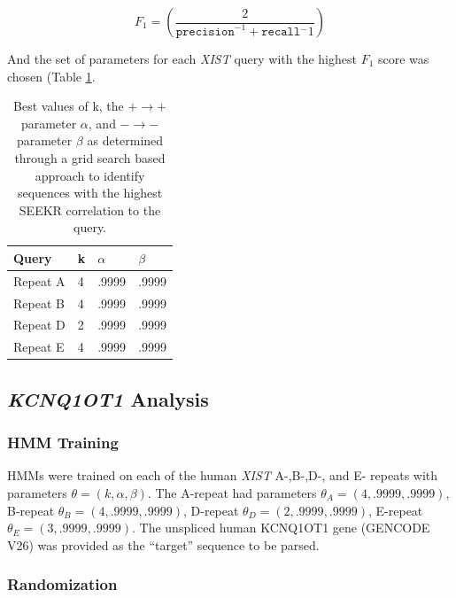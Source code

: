 \begin{equation}
    F_1 = \left(\frac{2}{\texttt{precision}^{-1}+\texttt{recall}{^-1}}\right)
\end{equation}

And the set of parameters for each \emph{XIST} query with the highest $F_1$ score was chosen (Table \ref{tbl:rsxparams}.

\begin{table}[h]
\centering
\begin{center}
 \begin{tabular}{|l| l| l | l |} 
 \hline
 Query & k & $\alpha$ & $\beta$ \\
 \hline
 Repeat A & 4 & .9999 & .9999 \\ 
 \hline
 Repeat B & 4 & .9999 & .9999\\
 \hline
 Repeat D & 2 & .9999 & .9999\\
 \hline
 Repeat E & 4 & .9999 & .9999\\
 \hline
\end{tabular}
\end{center}
\caption[\emph{Rsx} F1-score best parameters]{Best values of k, the $+\rightarrow +$ parameter $\alpha$, and $-\rightarrow -$ parameter $\beta$ as determined through a grid search based approach to identify sequences with the highest SEEKR correlation to the query.}
\label{tbl:rsxparams}
\end{table}

\subsection{\textit{KCNQ1OT1} Analysis}

\subsubsection{HMM Training}
HMMs were trained on each of the human \emph{XIST} A-,B-,D-, and E- repeats \cite{Brown10TheNucleus.} with parameters $\theta = (k,\alpha,\beta)$. The A-repeat had parameters $\theta_A = (4,.9999,.9999)$, B-repeat $\theta_B = (4,.9999,.9999)$, D-repeat $\theta_D = (2,.9999,.9999)$, E-repeat $\theta_E = (3,.9999,.9999)$. The unspliced human KCNQ1OT1 gene (GENCODE V26) was provided as the ``target'' sequence to be parsed. 

\subsubsection{Randomization}

